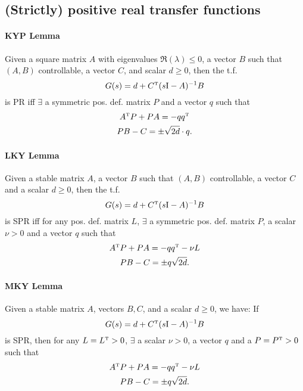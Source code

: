 \subsection{(Strictly) positive real transfer functions}

\paragraph{KYP Lemma}
Given a square matrix $A$ with eigenvalues $\Re(\lambda) \leq 0$, a vector $B$ such that $(A,B)$ controllable, a vector $C$, and scalar $d \geq 0$, then the t.f.
\begin{equation}
	G(s) = d + C^{\scriptscriptstyle \mathrm{T}} (s \mathrm{I} - A)^{-1} B
\end{equation}
is PR iff $\exists$ a symmetric pos. def. matrix $P$ and a vector $q$ such that
\begin{gather}
	A^{\scriptscriptstyle \mathrm{T}} P + P A = -q q^{\scriptscriptstyle \mathrm{T}} \\
	P B - C = \pm \sqrt{2d} \cdot q
	.
\end{gather}

\paragraph{LKY Lemma}
Given a stable matrix $A$, a vector $B$ such that $(A,B)$ controllable, a vector $C$ and a scalar $d \geq 0$, then the t.f.
\begin{equation}
	G(s) = d + C^{\scriptscriptstyle \mathrm{T}} (s \mathrm{I} - A)^{-1} B
\end{equation}
is SPR iff for any pos. def. matrix $L$, $\exists$ a symmetric pos. def. matrix $P$, a scalar $\nu > 0$ and a vector $q$ such that
\begin{gather}
	A^{\scriptscriptstyle \mathrm{T}} P + P A = -q q^{\scriptscriptstyle \mathrm{T}} - \nu L \\
	P B - C = \pm q \sqrt{2d}
	.
\end{gather}

\paragraph{MKY Lemma}
Given a stable matrix $A$, vectors $B,C$, and a scalar $d \geq 0$, we have: If
\begin{equation}
	G(s) = d + C^{\scriptscriptstyle \mathrm{T}} (s \mathrm{I} - A)^{-1} B
\end{equation}
is SPR, then for any $L = L^{\scriptscriptstyle \mathrm{T}} > 0$, $\exists$ a scalar $\nu > 0$, a vector $q$ and a $P = P^{\scriptscriptstyle \mathrm{T}} > 0$ such that
\begin{gather}
	A^{\scriptscriptstyle \mathrm{T}} P + P A = -q q^{\scriptscriptstyle \mathrm{T}} - \nu L \\
	P B - C = \pm q \sqrt{2d}
	.
\end{gather}